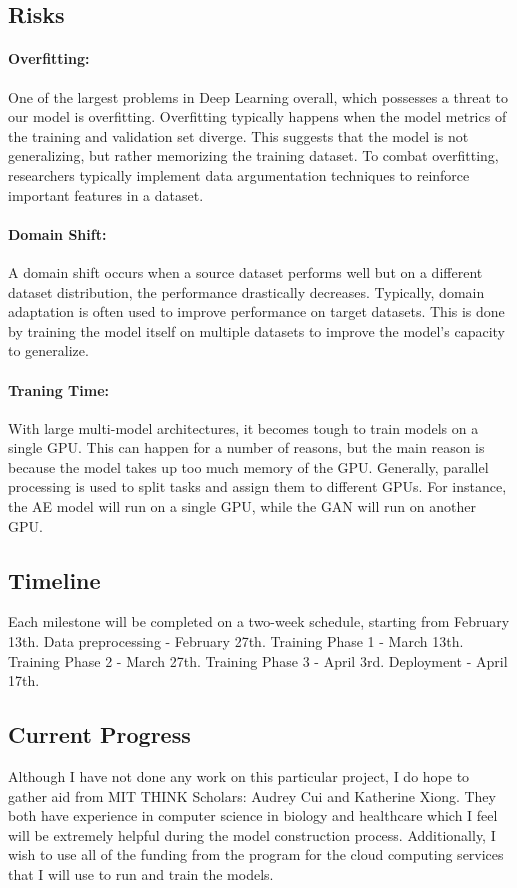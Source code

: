 \documentclass{article}
\begin{document}
\subsection{Risks}
\paragraph{Overfitting:}
One of the largest problems in Deep Learning overall, which possesses a threat to our model is overfitting. Overfitting typically happens when the model metrics of the training and validation set diverge. This suggests that the model is not generalizing, but rather memorizing the training dataset. To combat overfitting, researchers typically implement data argumentation techniques to reinforce important features in a dataset. 

\paragraph{Domain Shift:}
A domain shift occurs when a source dataset performs well but on a different dataset distribution, the performance drastically decreases. Typically, domain adaptation is often used to improve performance on target datasets. This is done by training the model itself on multiple datasets to improve the model's capacity to generalize.

\paragraph{Traning Time:}
With large multi-model architectures, it becomes tough to train models on a single GPU. This can happen for a number of reasons, but the main reason is because the model takes up too much memory of the GPU. Generally, parallel processing is used to split tasks and assign them to different GPUs. For instance, the AE model will run on a single GPU, while the GAN will run on another GPU.

\subsection{Timeline}
Each milestone will be completed on a two-week schedule, starting from February 13th.
Data preprocessing - February 27th.
Training Phase 1 - March 13th.
Training Phase 2 - March 27th.
Training Phase 3 - April 3rd.
Deployment - April 17th.


\subsection{Current Progress}
Although I have not done any work on this particular project, I do hope to gather aid from MIT THINK Scholars: Audrey Cui and Katherine Xiong. They both have experience in computer science in biology and healthcare which I feel will be extremely helpful during the model construction process. Additionally, I wish to use all of the funding from the program for the cloud computing services that I will use to run and train the models.
\end{document}
